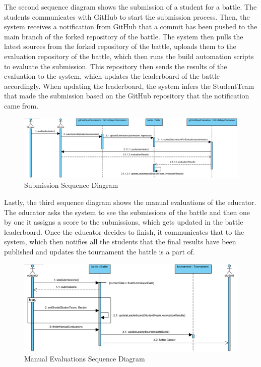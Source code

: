 \documentclass{article}
\begin{document}
The second sequence diagram shows the submission of a student for a battle. The students communicates with GitHub
to start the submission process. Then, the system receives a notification from GitHub that a commit has been pushed
to the main branch of the forked repository of the battle. The system then pulls the latest sources from the forked
repository of the battle, uploads them to the evaluation repository of the battle, which then runs the build automation
scripts to evaluate the submission. This repository then sends the results of the evaluation to the system, which updates
the leaderboard of the battle accordingly. When updating the leaderboard, the system infers the StudentTeam that made the
submission based on the GitHub repository that the notification came from. 

\begin{figure}[!h]
    \centering
    \includegraphics[width=1\textwidth]{images/SubmissionSequenceDiagram}
    \caption{Submission Sequence Diagram}
    \label{fig:SubmissionSequenceDiagram}
\end{figure}

Lastly, the third sequence diagram shows the manual evaluations of the educator. The educator asks the system
to see the submissions of the battle and then one by one it assigns a score to the submissions, which gets updated 
in the battle leaderboard. Once the educator decides to finish, it communicates that to the system, which then
notifies all the students that the final results have been published and updates the tournament the battle is a part of.

\begin{figure}[!h]
    \centering
    \includegraphics[width=1\textwidth]{images/ManualEvaluationsSequenceDiagram}
    \caption{Manual Evaluations Sequence Diagram}
    \label{fig:ManualEvaluationsSequenceDiagram}
\end{figure}
\end{document}
